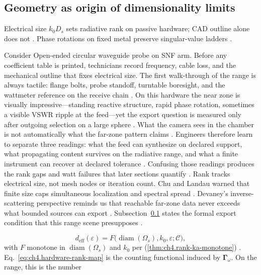\subsection{Geometry as origin of dimensionality limits}
\label{sec:ch491}
Electrical size $k_0 D_s$ sets radiative rank on passive hardware; CAD outline alone does not \cite{stratton1941}. Phase rotations on fixed metal preserve singular-value ladders \cite{harrington2001}.
\medskip
\begin{physicalvignette}
Consider Open-ended circular waveguide probe on SNF arm. Before any coefficient table is printed, technicians record frequency, cable loss, and the mechanical outline that fixes electrical size. The first walk-through of the range is always tactile: flange bolts, probe standoff, turntable boresight, and the wattmeter reference on the receive chain \cite{hansen1988}.
On this hardware the near zone is visually impressive---standing reactive structure, rapid phase rotation, sometimes a visible VSWR ripple at the feed---yet the export question is measured only after outgoing selection on a large sphere \cite{harrington2001}. What the camera sees in the chamber is not automatically what the far-zone pattern claims \cite{stratton1941}.
Engineers therefore learn to separate three readings: what the feed can synthesize on declared support, what propagating content survives on the radiative range, and what a finite instrument can recover at declared tolerance \cite{devaney2004}. Confusing those readings produces the rank gaps and watt failures that later sections quantify \cite{pal2026}.
Rank tracks electrical size, not mesh nodes or iteration count. 
Chu and Landau warned that finite size caps simultaneous localization and spectral spread \cite{chu1948}. Devaney's inverse-scattering perspective reminds us that reachable far-zone data never exceeds what bounded sources can export \cite{devaney2004}.
Subsection~\ref{sec:ch491} states the formal export condition that this range scene presupposes \cite{stratton1941}.
\end{physicalvignette}
\begin{equation}
\label{eq:ch4.hardware-rank-map}
d_{\mathrm{eff}}(\varepsilon)=F\big(\operatorname{diam}(\Omega_{s}),k_{0},\varepsilon;\mathcal{C}\big),
\end{equation}
with \(F\) monotone in \(\operatorname{diam}(\Omega_{s})\) and \(k_{0}\) per (\ref{thm:ch4.rank-ka-monotone}) \cite{stratton1941}.
Eq.~\eqref{eq:ch4.hardware-rank-map} is the counting functional induced by \(\boldsymbol{\Gamma}_\omega\). On the range, this is the number

